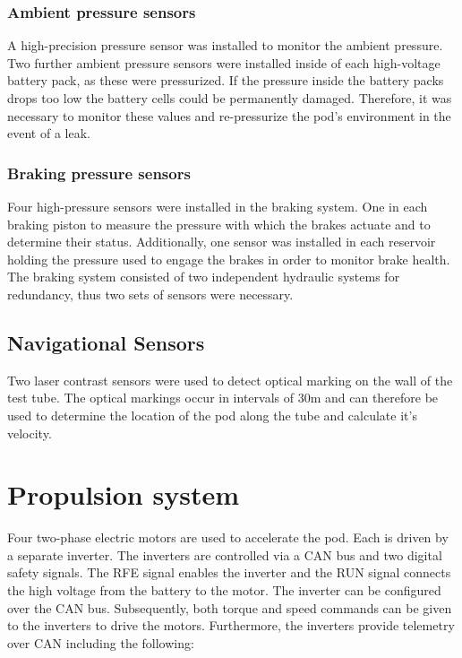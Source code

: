 \subsubsection{Ambient pressure sensors}

A high-precision pressure sensor was installed to monitor the ambient pressure. Two further ambient pressure sensors were installed inside of each high-voltage battery pack, as these were pressurized. If the pressure inside the battery packs drops too low the battery cells could be permanently damaged. Therefore, it was necessary to monitor these values and re-pressurize the pod's environment in the event of a leak.

\subsubsection{Braking pressure sensors}

Four high-pressure sensors were installed in the braking system. One in each braking piston to measure the pressure with which the brakes actuate and to determine their status. Additionally, one sensor was installed in each reservoir holding the pressure used to engage the brakes in order to monitor brake health. The braking system consisted of two independent hydraulic systems for redundancy, thus two sets of sensors were necessary.

\subsection{Navigational Sensors}

Two laser contrast sensors were used to detect optical marking on the wall of the test tube. The optical markings occur in intervals of 30m and can therefore be used to determine the location of the pod along the tube and calculate it's velocity.

\section{Propulsion system} \label{spec_inverter}

Four two-phase electric motors are used to accelerate the pod. Each is driven by a separate inverter. The inverters are controlled via a CAN bus and two digital safety signals. The RFE signal enables the inverter and the RUN signal connects the high voltage from the battery to the motor. The inverter can be configured over the CAN bus. Subsequently, both torque and speed commands can be given to the inverters to drive the motors. Furthermore, the inverters provide telemetry over CAN including the following:

